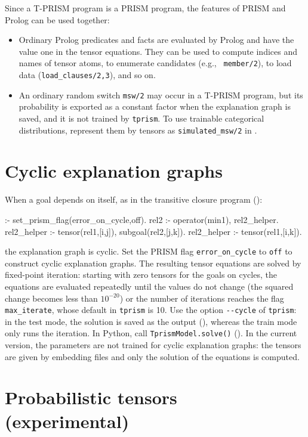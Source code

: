 \documentclass[a4paper]{report}
\begin{document}
Since a T-PRISM program is a PRISM program, the features of PRISM and
Prolog can be used together:
\begin{itemize}
	\item Ordinary Prolog predicates and facts are evaluated by Prolog and
	have the value one in the tensor equations.  They can be used to compute
	indices and names of tensor atoms, to enumerate candidates (e.g., {\tt
		member/2}), to load data ({\tt load\_clauses/2,3}), and so on.
	\item An ordinary random switch {\tt msw/2} may occur in a T-PRISM
	program, but its probability is exported as a constant factor when the
	explanation graph is saved, and it is not trained by {\tt tprism}.  To
	use trainable categorical distributions, represent them by tensors as
	{\tt simulated\_msw/2} in .
\end{itemize}

\section{Cyclic explanation graphs}
\label{sec:cyclic}

When a goal depends on itself, as in the transitive closure program
():
\begin{prologcode}
:- set_prism_flag(error_on_cycle,off).
rel2 :- operator(min1), rel2_helper.
rel2_helper :- tensor(rel1,[i,j]), subgoal(rel2,[j,k]).
rel2_helper :- tensor(rel1,[i,k]).
\end{prologcode}
the explanation graph is cyclic.  Set the PRISM flag {\tt error\_on\_cycle}
to {\tt off} to construct cyclic explanation graphs.  The resulting tensor
equations are solved by fixed-point iteration: starting with zero tensors
for the goals on cycles, the equations are evaluated repeatedly until the
values do not change (the squared change becomes less than $10^{-20}$) or
the number of iterations reaches the flag {\tt max\_iterate}, whose default
in {\tt tprism} is 10.  Use the option {\tt -{}-cycle} of {\tt tprism}:
in the test mode, the solution is saved as the output
(), whereas the train mode only runs the
iteration.  In Python, call {\tt TprismModel.solve()} ().  In the current version, the
parameters are not trained for cyclic explanation graphs: the tensors are
given by embedding files and only the solution of the equations is computed.

\section{Probabilistic tensors (experimental)}
\label{sec:prob_tensor}
\end{document}
